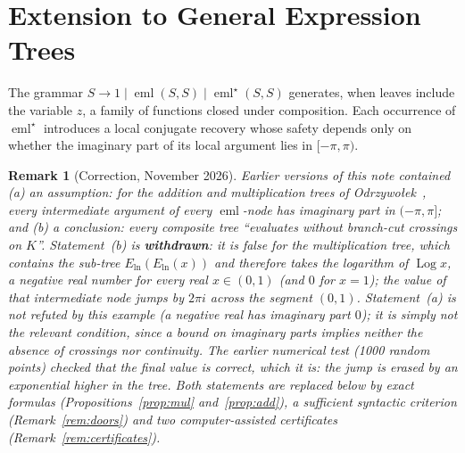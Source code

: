 \documentclass[11pt,a4paper]{article}
\newtheorem{remark}[theorem]{Remark}
\theoremstyle{definition}
\newcommand{\eml}{\operatorname{eml}}
\newcommand{\emlstar}{\operatorname{eml}^\star}
\newcommand{\Log}{\operatorname{Log}}   %
\begin{document}
\section{Extension to General Expression Trees}
\label{sec:trees}

The grammar $S\to 1 \mid \eml(S,S) \mid \emlstar(S,S)$ generates, when leaves
include the variable $z$, a family of functions closed under composition.
Each occurrence of $\emlstar$ introduces a local conjugate recovery whose
safety depends only on whether the imaginary part of its local argument lies
in $[-\pi,\pi)$.

\begin{remark}[Correction, November 2026]
\label{rem:correction}
Earlier versions of this note contained (a) an \emph{assumption}: for the
addition and multiplication trees of Odrzywołek~\cite{odrzywolek2026}, every
intermediate argument of every $\eml$-node has imaginary part in
$(-\pi,\pi]$; and (b) a \emph{conclusion}: every composite tree ``evaluates
without branch-cut crossings on $K$''.  Statement~(b) is \textbf{withdrawn}:
it is false for the multiplication tree, which contains the sub-tree
$E_{\ln}(E_{\ln}(x))$ and therefore takes the logarithm of $\Log x$, a
negative real number for every real $x\in(0,1)$ (and $0$ for $x=1$); the value
of that intermediate node jumps by $2\pi i$ across the segment $(0,1)$.
Statement~(a) is not refuted by this example (a negative real has imaginary
part $0$); it is simply not the relevant condition, since a bound on
imaginary parts implies neither the absence of crossings nor continuity.
The earlier numerical test (1000 random points) checked that the
\emph{final} value is correct, which it is: the jump is erased by an
exponential higher in the tree.  Both statements are replaced below by exact
formulas (Propositions~\ref{prop:mul} and~\ref{prop:add}), a sufficient
syntactic criterion (Remark~\ref{rem:doors}) and two computer-assisted
certificates (Remark~\ref{rem:certificates}).
\end{remark}
\end{document}
